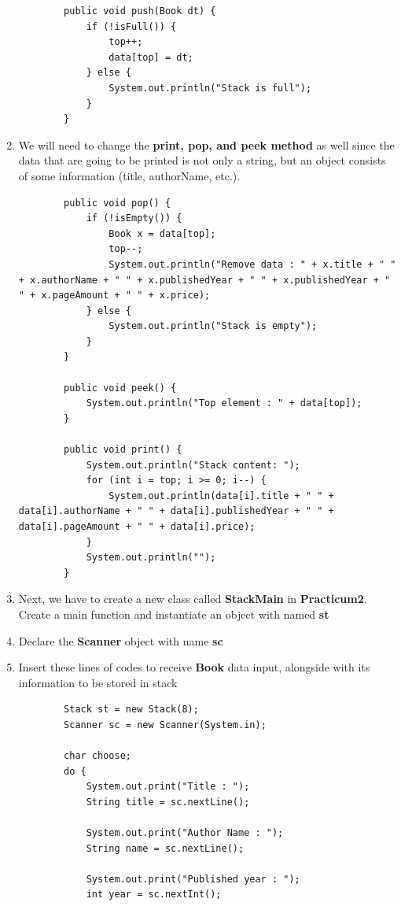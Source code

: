 \documentclass[12pt,titlepage]{article}
\begin{document}
\begin{enumerate}
\begin{verbatim}
        public void push(Book dt) {
            if (!isFull()) {
                top++;
                data[top] = dt;
            } else {
                System.out.println("Stack is full");
            }
        }
    \end{verbatim}
    \item We will need to change the \textbf{print, pop, and peek method} as well since the data that are going to be printed is not only a string, but an object consists of some information (title, authorName, etc.).
    \begin{verbatim}
        public void pop() {
            if (!isEmpty()) {
                Book x = data[top];
                top--;
                System.out.println("Remove data : " + x.title + " " + x.authorName + " " + x.publishedYear + " " + x.publishedYear + " " + x.pageAmount + " " + x.price);
            } else {
                System.out.println("Stack is empty");
            }
        }

        public void peek() {
            System.out.println("Top element : " + data[top]);
        }

        public void print() {
            System.out.println("Stack content: ");
            for (int i = top; i >= 0; i--) {
                System.out.println(data[i].title + " " + data[i].authorName + " " + data[i].publishedYear + " " + data[i].pageAmount + " " + data[i].price);
            }
            System.out.println("");
        }
    \end{verbatim}
    \item Next, we have to create a new class called \textbf{StackMain} in \textbf{Practicum2}. Create a main function and instantiate an object with named \textbf{st}
    \item Declare the \textbf{Scanner} object with name \textbf{sc}
    \item Insert these lines of codes to receive \textbf{Book} data input, alongside with its information to be stored in stack
    \begin{verbatim}
        Stack st = new Stack(8);
        Scanner sc = new Scanner(System.in);

        char choose;
        do {
            System.out.print("Title : ");
            String title = sc.nextLine();
            
            System.out.print("Author Name : ");
            String name = sc.nextLine();

            System.out.print("Published year : ");
            int year = sc.nextInt();


\end{verbatim}
\end{enumerate}
\end{document}
